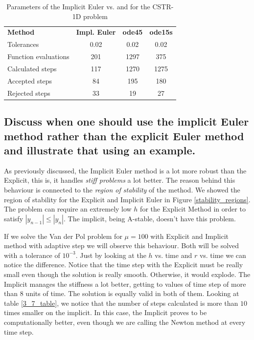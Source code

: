 \begin{table}[H]
    \centering
    \begin{tabular}{@{}l|c|c|c@{}}
    \toprule
    \textbf{Method}      & \textbf{Impl. Euler} & \textbf{ode45} & \textbf{ode15s} \\
    Tolerances           & 0.02                 & 0.02           & 0.02            \\ \midrule
    Function evaluations & 201                  & 1297           & 375             \\
    Calculated steps     & 117                  & 1270           & 1275            \\
    Accepted steps       & 84                   & 195            & 180             \\
    Rejected steps       & 33                   & 19             & 27              \\ \bottomrule
    \end{tabular}
    \caption{Parameters of the Implicit Euler vs.  and  for the CSTR-1D problem}
    \label{3_6_1D_table}
\end{table}

\pagebreak

\subsection{Discuss when one should use the implicit Euler method rather than the
explicit Euler method and illustrate that using an example.}
As previously discussed, the Implicit Euler method is a lot more robust than the Explicit, this is, it handles \textit{stiff problems} a lot better. The reason behind this behaviour is connected to the \textit{region of stability} of the method. We showed the region of stability for the Explicit and Implicit Euler in Figure \ref{stability_regions}. The problem can require an extremely low $h$ for the Explicit Method in order to satisfy $|y_{n-1}| \leq |y_n|$. The implicit, being A-stable, doesn't have this problem.

If we solve the Van der Pol problem for $\mu = 100$ with Explicit and Implicit method with adaptive step we will observe this behaviour. Both will be solved with a tolerance of $10^{-3}$. Just by looking at the $h$ vs. time and $r$ vs. time we can notice the difference. Notice that the time step with the Explicit must be really small even though the solution is really smooth. Otherwise, it would explode. The Implicit manages the stiffness a lot better, getting to values of time step of more than $8$ units of time. The solution is equally valid in both of them. Looking at table \ref{3_7_table}, we notice that the number of steps calculated is more than $10$ times smaller on the implicit. In this case, the Implicit proves to be computationally better, even though we are calling the Newton method at every time step. 

